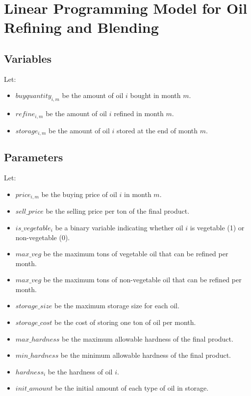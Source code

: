 \documentclass{article}
\begin{document}
\section*{Linear Programming Model for Oil Refining and Blending}

\subsection*{Variables}

Let:
\begin{itemize}
    \item $buyquantity_{i,m}$ be the amount of oil $i$ bought in month $m$.
    \item $refine_{i,m}$ be the amount of oil $i$ refined in month $m$.
    \item $storage_{i,m}$ be the amount of oil $i$ stored at the end of month $m$.
\end{itemize}

\subsection*{Parameters}

Let:
\begin{itemize}
    \item $price_{i,m}$ be the buying price of oil $i$ in month $m$.
    \item $sell\_price$ be the selling price per ton of the final product.
    \item $is\_vegetable_{i}$ be a binary variable indicating whether oil $i$ is vegetable (1) or non-vegetable (0).
    \item $max\_veg$ be the maximum tons of vegetable oil that can be refined per month.
    \item $max\_veg$ be the maximum tons of non-vegetable oil that can be refined per month.
    \item $storage\_size$ be the maximum storage size for each oil.
    \item $storage\_cost$ be the cost of storing one ton of oil per month.
    \item $max\_hardness$ be the maximum allowable hardness of the final product.
    \item $min\_hardness$ be the minimum allowable hardness of the final product.
    \item $hardness_{i}$ be the hardness of oil $i$.
    \item $init\_amount$ be the initial amount of each type of oil in storage.
\end{itemize}
\end{document}
